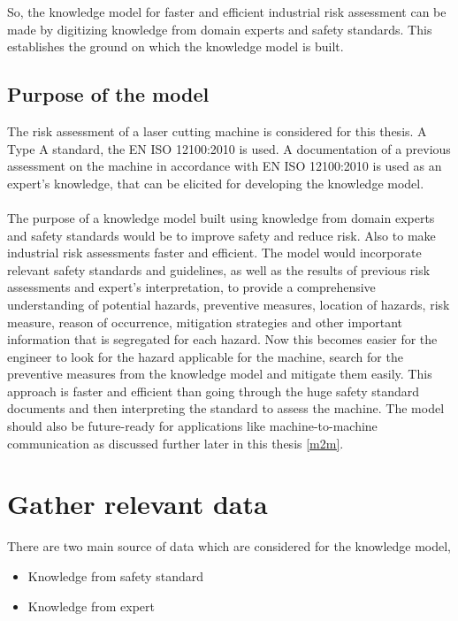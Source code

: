So, the knowledge model for faster and efficient industrial risk assessment can be made by digitizing knowledge from domain experts and safety standards. This establishes the ground on which the knowledge model is built.

\subsection{Purpose of the model}
The risk assessment of a laser cutting machine is considered for this thesis. A Type A standard, the EN ISO 12100:2010 is used. A documentation of a previous assessment on the machine in accordance with EN ISO 12100:2010 is used as an expert's knowledge, that can be elicited for developing the knowledge model.

\paragraph{} The purpose of a knowledge model built using knowledge from domain experts and safety standards would be to improve safety and reduce risk. Also to make industrial risk assessments faster and efficient. The model would incorporate relevant safety standards and guidelines, as well as the results of previous risk assessments and expert's interpretation, to provide a comprehensive understanding of potential hazards, preventive measures, location of hazards, risk measure, reason of occurrence, mitigation strategies and other important information that is segregated for each hazard. Now this becomes easier for the engineer to look for the hazard applicable for the machine, search for the preventive measures from the knowledge model and mitigate them easily. This approach is faster and efficient than going through the huge safety standard documents and then interpreting the standard to assess the machine. The model should also be future-ready for applications like machine-to-machine communication as discussed further later in this thesis \ref{m2m}.

\section{Gather relevant data}
\label{gather_relevant_data}

There are two main source of data which are considered for the knowledge model,
\begin{itemize}
    \item Knowledge from safety standard
    \item Knowledge from expert
\end{itemize}

